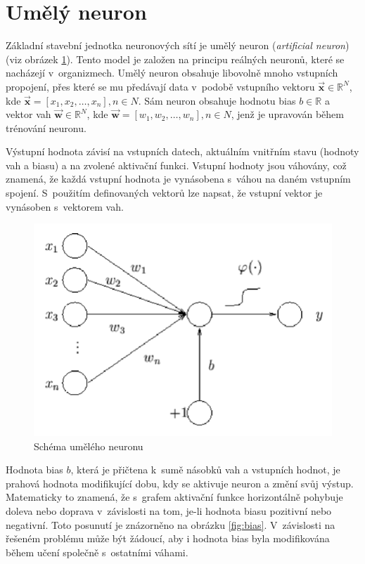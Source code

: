 \section{Umělý neuron}
Základní stavební jednotka neuronových sítí je umělý neuron (\textit{artificial neuron}) (viz obrázek \ref{fig:neuron}). Tento model je založen na principu reálných neuronů, které se nacházejí v~organizmech. Umělý neuron obsahuje libovolně mnoho vstupních propojení, přes které se mu předávají data v~podobě vstupního vektoru $\boldsymbol{\overrightarrow{x}} \in \mathbb{R}^N$, kde $\boldsymbol{\overrightarrow{x}} = [x_1, x_2, \dots, x_n], n \in N$. Sám neuron obsahuje hodnotu bias $b \in \mathbb{R}$ a vektor vah $\boldsymbol{\overrightarrow{w}} \in \mathbb{R}^N$, kde $\boldsymbol{\overrightarrow{w}} = [w_1, w_2, \dots, w_n], n \in N$, jenž je upravován během trénování neuronu.

Výstupní hodnota závisí na vstupních datech, aktuálním vnitřním stavu (hodnoty vah a biasu) a na zvolené aktivační funkci. Vstupní hodnoty jsou váhovány, což znamená, že každá vstupní hodnota je vynásobena s~váhou na daném vstupním spojení. S~použitím definovaných vektorů lze napsat, že vstupní vektor je vynásoben s~vektorem vah.

\begin{figure}[H]
    \centering
    \includegraphics[scale=0.35]{obrazky-figures/perceptron.png}
    \caption{\label{fig:neuron}Schéma umělého neuronu}
\end{figure}

Hodnota bias $b$, která je přičtena k~sumě násobků vah a vstupních hodnot, je prahová hodnota modifikující dobu, kdy se aktivuje neuron a změní svůj výstup. Matematicky to znamená, že s~grafem aktivační funkce horizontálně pohybuje doleva nebo doprava v~závislosti na tom, je-li hodnota biasu pozitivní nebo negativní. Toto posunutí je znázorněno na obrázku \ref{fig:bias}. V~závislosti na řešeném problému může být žádoucí, aby i hodnota bias byla modifikována během učení společně s~ostatními váhami.

